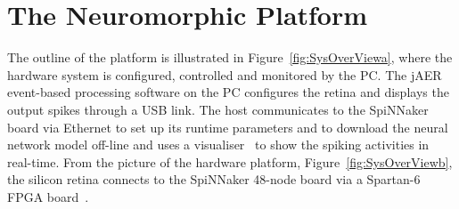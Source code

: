 \documentclass[journal]{journal}
\begin{document}
\section{The Neuromorphic Platform}
\label{sec:np}
The outline of the platform is illustrated in Figure~\ref{fig:SysOverViewa}, where the hardware system is configured, controlled and monitored by the PC.
The jAER~\cite{delbruck2008frame} event-based processing software on the PC configures the retina and displays the output spikes through a USB link.
The host communicates to the SpiNNaker board via Ethernet to set up its runtime parameters and to download the neural network model off-line and uses a visualiser~\cite{6252490} to show the spiking activities in real-time.
From the picture of the hardware platform, Figure~\ref{fig:SysOverViewb}, the silicon retina connects to the SpiNNaker 48-node board via a Spartan-6 FPGA board~\cite{galluppi2012real}.
\end{document}
